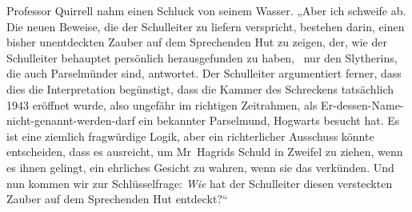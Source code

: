 Professor Quirrell nahm einen Schluck von seinem Wasser. „Aber ich schweife ab. Die neuen Beweise, die der Schulleiter zu liefern verspricht, bestehen darin, einen bisher unentdeckten Zauber auf dem Sprechenden Hut zu zeigen, der, wie der Schulleiter behauptet persönlich herausgefunden zu haben, ~nur den Slytherins, die auch Parselmünder sind, antwortet. Der Schulleiter argumentiert ferner, dass dies die Interpretation begünstigt, dass die Kammer des Schreckens tatsächlich 1943 eröffnet wurde, also ungefähr im richtigen Zeitrahmen, als Er-dessen-Name-nicht-genannt-werden-darf ein bekannter Parselmund, Hogwarts besucht hat. Es ist eine ziemlich fragwürdige Logik, aber ein richterlicher Ausschuss könnte entscheiden, dass es ausreicht, um Mr~Hagrids Schuld in Zweifel zu ziehen, wenn es ihnen gelingt, ein ehrliches Gesicht zu wahren, wenn sie das verkünden. Und nun kommen wir zur Schlüsselfrage: \emph{Wie} hat der Schulleiter diesen versteckten Zauber auf dem Sprechenden Hut entdeckt?“


